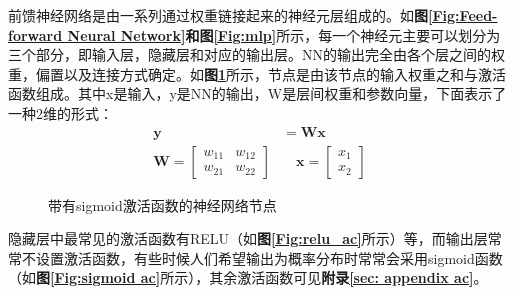 前馈神经网络是由一系列通过权重链接起来的神经元层组成的。如\textbf{图\ref{Fig:Feed-forward Neural Network}和图\ref{Fig:mlp}}所示，每一个神经元主要可以划分为三个部分，即输入层，隐藏层和对应的输出层。NN的输出完全由各个层之间的权重，偏置以及连接方式确定。如\textbf{图\ref{Fig:Neural Network Node with a Sigmoid Activation}}所示，节点是由该节点的输入权重之和与激活函数组成。其中x是输入，y是NN的输出，W是层间权重和参数向量，下面表示了一种2维的形式：
\begin{equation}
    \begin{aligned}
\mathbf{y} &=\mathbf{W} \mathbf{x} \\
\mathbf{W} =\left[\begin{array}{ll}
w_{11} & w_{12} \\
w_{21} & w_{22}
\end{array}\right] &\quad \mathbf{x}=\left[\begin{array}{l}
x_{1} \\
x_{2}
\end{array}\right]
\end{aligned}
\end{equation}



\begin{figure}[!t]
	\centering
	\caption{带有sigmoid激活函数的神经网络节点}
	\label{Fig:Neural Network Node with a Sigmoid Activation}
\end{figure}

隐藏层中最常见的激活函数有RELU（如\textbf{图\ref{Fig:relu_ac}}所示）等，而输出层常常不设置激活函数，有些时候人们希望输出为概率分布时常常会采用sigmoid函数（如\textbf{图\ref{Fig:sigmoid ac}}所示），其余激活函数可见\textbf{附录\ref{sec: appendix ac}}。

